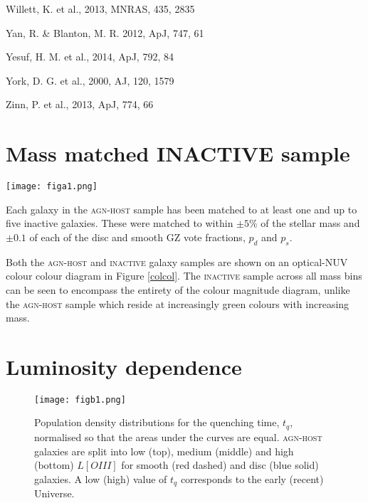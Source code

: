 \documentclass[useAMS,usenatbib]{mn2e}
\def\changedbds    {\color{ncc} }
\def\secondchange    {\color{srv} }
\begin{document}
\begin{thebibliography}{}
 Willett, K. et al., 2013, MNRAS, 435, 2835

 Yan, R. \& Blanton, M. R. 2012, ApJ, 747, 61

 Yesuf, H. M. et al., 2014, ApJ, 792, 84

 York, D. G. et al., 2000, AJ, 120, 1579

 Zinn, P. et al., 2013, ApJ, 774, 66

\end{thebibliography}{}

\appendix

\section{Mass matched INACTIVE sample}

\begin{figure*}
\texttt{[image: figa1.png]}
\caption{Optical-NUV colour-colour contour diagrams for the \textsc{agn-host} (top) and \textsc{inactive} galaxy samples split into low (blue), medium (green) and high (red) stellar mass samples. Underlaying each diagram are the contours of the \textsc{gz2-galex} sample (grey).}
\label{colcol}
\end{figure*}

Each galaxy in the \textsc{agn-host} sample has been matched to at least one and up to five inactive galaxies. These were matched to within $\pm5\%$ of the stellar mass and $\pm 0.1$ of each of the disc and smooth GZ vote fractions, $p_d$ and $p_s$.

Both the \textsc{agn-host} and \textsc{inactive} galaxy samples are shown on an optical-NUV colour colour diagram in Figure \ref{colcol}. The \textsc{inactive} sample across all mass bins can be seen to encompass the entirety of the colour magnitude diagram, unlike the \textsc{agn-host} sample which reside at increasingly green colours with increasing mass. 


\section{Luminosity dependence}

\begin{figure}
\texttt{[image: figb1.png]}
\caption{{\secondchange Population density} distributions for the quenching time, $t_q$, {\changedbds normalised so that the areas under the curves are equal}. \textsc{agn-host} galaxies are split into low (top), medium (middle) and high (bottom)  $L[OIII]$ for smooth (red dashed) and disc (blue solid) galaxies. A low (high) value of $t_q$ corresponds to the early (recent) Universe.}
\label{loiiitime}
\end{figure}
\end{document}
